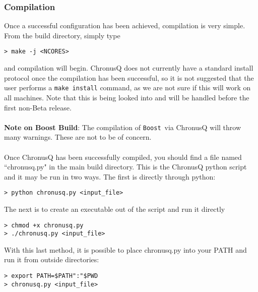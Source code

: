 \documentclass[12pt]{article}
\newcommand{\Boost}{\texttt{Boost}}
\begin{document}
    \subsubsection{Compilation} \label{subsubsec:ChronusQCompile}
    
    Once a successful configuration has been achieved, compilation is very simple.
    From the build directory, simply type

    \begin{lstlisting}
> make -j <NCORES>
    \end{lstlisting}

    \noindent and compilation will begin. ChronusQ does not currently have a 
    standard install protocol once the compilation has been successful, so it is
    not suggested that the user performs a \texttt{make install} command, as we are 
    not sure if this will work on all machines. Note that this is being looked into 
    and will be handled before the first non-Beta release.
    ~\\
    ~\\

    \noindent \textbf{Note on Boost Build}: The compilation of \Boost~via ChronusQ will
    throw many warnings. These are not to be of concern.\\
    \\
    
    \noindent Once ChronusQ has been successfully compiled, you should find a file
    named ``chronusq.py" in the main build directory. This is the ChronusQ python
    script and it may be run in two ways. The first is directly through python:

    \begin{lstlisting}
> python chronusq.py <input_file>
    \end{lstlisting}

    \noindent The next is to create an executable out of the script and run it
    directly

    \begin{lstlisting}
> chmod +x chronusq.py
> ./chronusq.py <input_file>
    \end{lstlisting}

    \noindent With this last method, it is possible to place chronusq.py into your
    PATH and run it from outside directories:

    \begin{lstlisting}
> export PATH=$PATH":"$PWD
> chronusq.py <input_file>
    \end{lstlisting}
\end{document}

